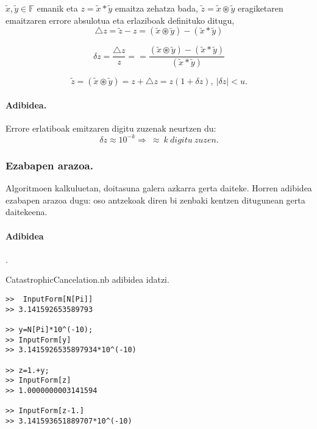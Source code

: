 $\tilde x,\tilde y \in \mathbb{F}$ emanik eta $z= \tilde x \ast \tilde y$ emaitza zehatza bada, $\tilde z= \tilde x \circledast \tilde y$ eragiketaren emaitzaren errore absulotua eta erlaziboak definituko ditugu,
\begin{equation*}
\triangle z=\tilde z-z =(\tilde x \circledast \tilde y) -(\tilde x \ast \tilde y)
\end{equation*} 

\begin{equation*}
\delta z=\frac{\triangle z}{z}==\frac{(\tilde x \circledast \tilde y) -(\tilde x \ast \tilde y)}{(\tilde x \ast \tilde y)}
\end{equation*} 

\begin{equation*}
\tilde z=(\tilde x \circledast \tilde y)=z+\triangle z=z(1+\delta z), \ |\delta z|<u. 
\end{equation*}


\paragraph*{\textbf{Adibidea.}}
Errore erlatiboak emitzaren digitu zuzenak neurtzen du:
\begin{equation*}
\delta z \approx 10^{-k} \Rightarrow \ \approx \ k \ digitu \ zuzen.
\end{equation*}  

\subsubsection*{Ezabapen arazoa.}

Algoritmoen kalkuluetan, doitasuna galera azkarra gerta daiteke. Horren adibidea ezabapen arazoa dugu: oso antzekoak diren bi zenbaki kentzen ditugunean gerta daitekeena. 

\paragraph*{\textbf{Adibidea}}.

CatastrophicCancelation.nb adibidea idatzi.


\begin{lstlisting}
>>  InputForm[N[Pi]]
>> 3.141592653589793

>> y=N[Pi]*10^(-10);
>> InputForm[y]
>> 3.1415926535897934*10^(-10)

>> z=1.+y;
>> InputForm[z]
>> 1.0000000003141594

>> InputForm[z-1.]
>> 3.141593651889707*10^(-10)

\end{lstlisting}
 

